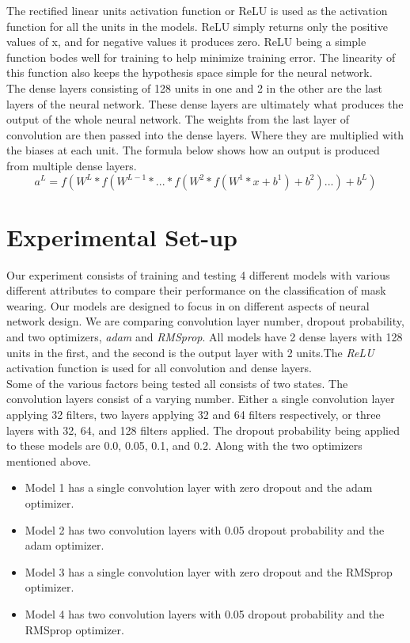 \documentclass[twocolumn,letterpaper,10pt]{article}
\begin{document}
The rectified linear units activation function or ReLU is used as the activation function for all the units in the models. ReLU simply returns only the positive values of x, and for negative values it produces zero. ReLU being a simple function bodes well for training to help minimize training error. The linearity of this function also keeps the hypothesis space simple for the neural network.\\

The dense layers consisting of 128 units in one and 2 in the other are the last layers of the neural network. These dense layers are ultimately what produces the output of the whole neural network. The weights from the last layer of convolution are then passed into the dense layers. Where they are multiplied with the biases at each unit. The formula below shows how an output is produced from multiple dense layers. 
$$
a^L = f(W^L * f(W^{L-1} * ... * f(W^2 * f(W^1 * x + b^1) + b^2) ... ) + b^L)
$$

\section{Experimental Set-up} 
\label{setup}

Our experiment consists of training and testing 4 different models with various different attributes to compare their performance on the classification of mask wearing. Our models are designed to focus in on  different aspects of neural network design. We are comparing convolution layer number, dropout probability, and two optimizers, {\it adam} and {\it RMSprop}. All models have 2 dense layers with 128 units in the first, and the second is the output layer with 2 units.The {\it ReLU} activation function is used for all convolution and dense layers.\\

Some of the various factors being tested all consists of two states. The convolution layers consist of a varying number. Either a single convolution layer applying 32 filters, two layers applying 32 and 64 filters respectively, or three layers with 32, 64, and 128 filters applied. The dropout probability being applied to these models are 0.0, 0.05, 0.1, and 0.2. Along with the two optimizers mentioned above.

\begin{itemize}
        \item Model 1 has a single convolution layer with zero dropout and the adam optimizer.
        \item Model 2 has two convolution layers with 0.05 dropout probability and the adam            optimizer.
        \item Model 3 has a single convolution layer with zero dropout and the RMSprop optimizer.
        \item Model 4 has two convolution layers with 0.05 dropout probability and the RMSprop optimizer.
\end{itemize}
\end{document}
